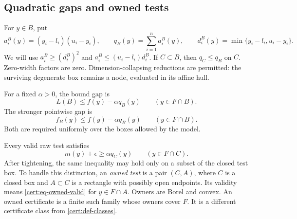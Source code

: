 \subsection{Quadratic gaps and owned tests}

For $y\in B$, put
\begin{equation}\label{cert:eq-q}
 a_i^B(y)=(y_i-l_i)(u_i-y_i),\qquad
 q_B(y)=\sum_{i=1}^n a_i^B(y),\qquad
 d_i^B(y)=\min\{y_i-l_i,u_i-y_i\}.
\end{equation}
We will use $a_i^B\geq(d_i^B)^2$ and
$a_i^B\leq(u_i-l_i)d_i^B$. If $C\subset B$, then $q_C\leq q_B$ on $C$.
Zero-width factors are zero. Dimension-collapsing reductions are permitted:
the surviving degenerate box remains a node, evaluated in its affine hull.

\begin{assumption}\label{cert:ass-gap}
For a fixed $\alpha>0$, the bound gap is
\begin{equation}\label{cert:eq-bound-gap}
 L(B)\leq f(y)-\alpha q_B(y)\qquad(y\in F\cap B).
\end{equation}
The stronger pointwise gap is
\begin{equation}\label{cert:eq-point-gap}
 f_B(y)\leq f(y)-\alpha q_B(y)\qquad(y\in F\cap B).
\end{equation}
Both are required uniformly over the boxes allowed by the model.
\end{assumption}

Every valid raw test satisfies
\begin{equation}\label{cert:eq-owned-valid}
 m(y)+\epsilon\geq\alpha q_C(y)\qquad(y\in F\cap C).
\end{equation}
After tightening, the same inequality may hold only on a subset of the
closed test box. To handle this distinction, an \emph{owned test} is a
pair $(C,A)$, where $C$ is a closed box and $A\subset C$ is a rectangle
with possibly open endpoints. Its validity means
\cref{cert:eq-owned-valid} for $y\in F\cap A$. Owners are Borel and convex.
An owned certificate is a finite such family whose owners cover $F$.
It is a different certificate class from \cref{cert:def-classes}.

